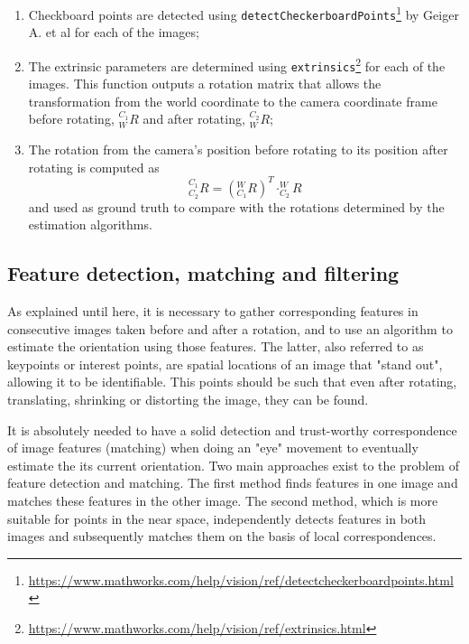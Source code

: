 \begin{enumerate}
	\item Checkboard points are detected using \texttt{detectCheckerboardPoints}\footnote{\href{https://www.mathworks.com/help/vision/ref/detectcheckerboardpoints.html}{https://www.mathworks.com/help/vision/ref/detectcheckerboardpoints.html}} by Geiger A. et al \cite{geiger} for each of the images;
	\item The extrinsic parameters are determined using \texttt{extrinsics}\footnote{\href{https://www.mathworks.com/help/vision/ref/extrinsics.html}{https://www.mathworks.com/help/vision/ref/extrinsics.html}} for each of the images. This function outputs a rotation matrix that allows the transformation from the world coordinate to the camera coordinate frame before rotating, $^{C_1}_{W}R$ and after rotating, $^{C_2}_{W}R$;
	\item The rotation from the camera's position before rotating to its position after rotating is computed as
	\begin{equation}
		^{C_1}_{C_2}R = (^{W}_{C_1}R)^T  \cdot  ^{W}_{C_2}R
	\end{equation}
	and used as ground truth to compare with the rotations determined by the estimation algorithms.
\end{enumerate}

\subsection{Feature detection, matching and filtering}
\label{cha3:features}

As explained until here, it is necessary to gather corresponding features in consecutive images taken before and after a rotation, and to use an algorithm to estimate the orientation using those features. The latter, also referred to as keypoints or interest points, are spatial locations of an image that "stand out", allowing it to be identifiable. This points should be such that even after rotating, translating, shrinking or distorting the image, they can be found.

It is absolutely needed to have a solid detection and trust-worthy correspondence of image features (matching) when doing an "eye" movement to eventually estimate the its current orientation. Two main approaches exist to the problem of feature detection and matching. The first method finds features in one image and matches these features in the other image. The second method, which is more suitable for points in the near space, independently detects features in both images and subsequently matches them on the basis of local correspondences.

